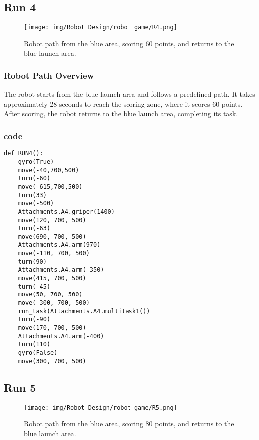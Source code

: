 \newpage
\subsection{Run 4}
\begin{figure}[h]
    \centering
    \texttt{[image: img/Robot Design/robot game/R4.png]}
    \caption{Robot path from the blue area, scoring 60 points, and returns to the blue launch area.}
    \label{fig:robot_path}
\end{figure}
\subsubsection{Robot Path Overview}

The robot starts from the blue launch area and follows a predefined path. It takes approximately 28 seconds to reach the scoring zone, where it scores 60 points. After scoring, the robot returns to the blue launch area, completing its task.
\subsubsection{code}
\begin{lstlisting}
def RUN4():
    gyro(True)
    move(-40,700,500) 
    turn(-60)
    move(-615,700,500)
    turn(33)
    move(-500)
    Attachments.A4.griper(1400)
    move(120, 700, 500)
    turn(-63)
    move(690, 700, 500)
    Attachments.A4.arm(970)
    move(-110, 700, 500)
    turn(90)
    Attachments.A4.arm(-350)
    move(415, 700, 500)
    turn(-45)
    move(50, 700, 500)
    move(-300, 700, 500)
    run_task(Attachments.A4.multitask1())
    turn(-90)
    move(170, 700, 500)
    Attachments.A4.arm(-400)
    turn(110)
    gyro(False)
    move(300, 700, 500)
\end{lstlisting}






\newpage
\subsection{Run 5}
\begin{figure}[h]
    \centering
    \texttt{[image: img/Robot Design/robot game/R5.png]}
    \caption{Robot path from the blue area, scoring 80 points, and returns to the blue launch area.}
    \label{fig:robot_path}
\end{figure}
